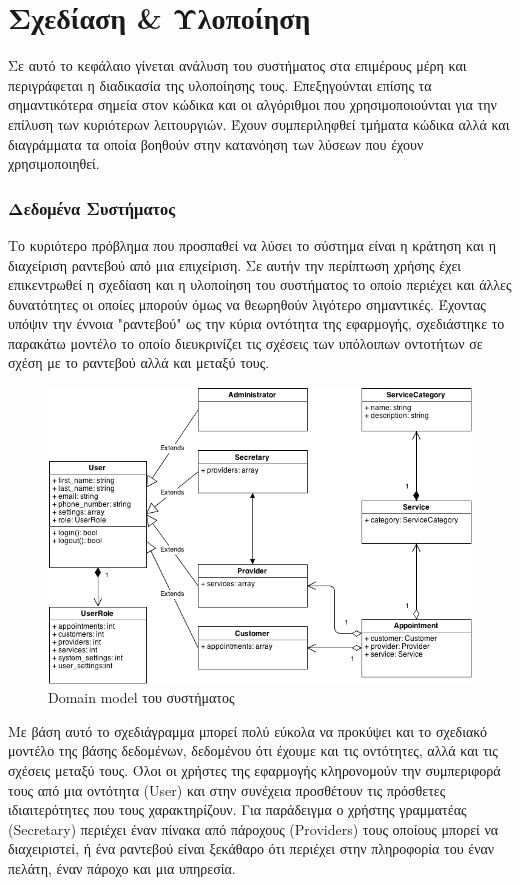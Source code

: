 \chapter{Σχεδίαση \& Υλοποίηση}
Σε αυτό το κεφάλαιο γίνεται ανάλυση του συστήματος στα επιμέρους μέρη και περιγράφεται η διαδικασία της υλοποίησης τους. Επεξηγούνται επίσης τα σημαντικότερα σημεία στον κώδικα και οι αλγόριθμοι που χρησιμοποιούνται για την επίλυση των κυριότερων λειτουργιών. Έχουν συμπεριληφθεί τμήματα κώδικα αλλά και διαγράμματα τα οποία βοηθούν στην κατανόηση των λύσεων που έχουν χρησιμοποιηθεί.

\subsection{Δεδομένα Συστήματος}
Το κυριότερο πρόβλημα που προσπαθεί να λύσει το σύστημα είναι η κράτηση και η διαχείριση ραντεβού από μια επιχείριση. Σε αυτήν την περίπτωση χρήσης έχει επικεντρωθεί η σχεδίαση και η υλοποίηση του συστήματος το οποίο περιέχει και άλλες δυνατότητες οι οποίες μπορούν όμως να θεωρηθούν λιγότερο σημαντικές. Έχοντας υπόψιν την έννοια "ραντεβού" ως την κύρια οντότητα της εφαρμογής, σχεδιάστηκε το παρακάτω μοντέλο το οποίο διευκρινίζει τις σχέσεις των υπόλοιπων οντοτήτων σε σχέση με το ραντεβού αλλά και μεταξύ τους.

\begin{figure}[ht!]
\centering
\includegraphics[width=160mm]{images/domain-model.png}
\caption{Domain model του συστήματος}
\label{domain-model}
\end{figure}

Με βάση αυτό το σχεδιάγραμμα μπορεί πολύ εύκολα να προκύψει και το σχεδιακό μοντέλο της βάσης δεδομένων, δεδομένου ότι έχουμε και τις οντότητες, αλλά και τις σχέσεις μεταξύ τους. Όλοι οι χρήστες της εφαρμογής κληρονομούν την συμπεριφορά τους από μια οντότητα (User) και στην συνέχεια προσθέτουν τις πρόσθετες ιδιαιτερότητες που τους χαρακτηρίζουν. Για παράδειγμα ο χρήστης γραμματέας (Secretary) περιέχει έναν πίνακα από πάροχους (Providers) τους οποίους μπορεί να διαχειριστεί, ή ένα ραντεβού είναι ξεκάθαρο ότι περιέχει στην πληροφορία του έναν πελάτη, έναν πάροχο και μια υπηρεσία.

